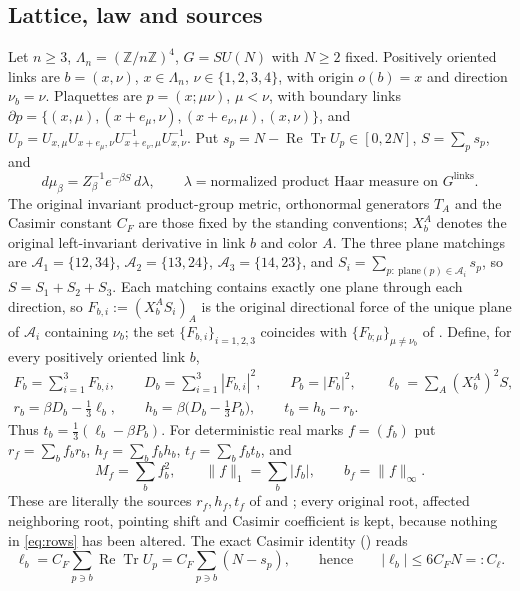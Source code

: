 \documentclass[11pt]{article}
\theoremstyle{definition}
\newcommand{\Tr}{\operatorname{Tr}}
\renewcommand{\Re}{\operatorname{Re}}
\begin{document}
\subsection{Lattice, law and sources}

Let $n\ge 3$, $\Lambda_n=(\mathbb Z/n\mathbb Z)^4$, $G=SU(N)$ with $N\ge 2$ fixed. Positively oriented links
are $b=(x,\nu)$, $x\in\Lambda_n$, $\nu\in\{1,2,3,4\}$, with origin $o(b)=x$ and direction $\nu_b=\nu$.
Plaquettes are $p=(x;\mu\nu)$, $\mu<\nu$, with boundary links $\partial p=\{(x,\mu),(x+e_\mu,\nu),(x+e_\nu,\mu),(x,\nu)\}$,
and $U_p=U_{x,\mu}U_{x+e_\mu,\nu}U_{x+e_\nu,\mu}^{-1}U_{x,\nu}^{-1}$. Put $s_p=N-\Re\Tr U_p\in[0,2N]$,
$S=\sum_p s_p$, and
\begin{equation}\label{eq:law}
d\mu_\beta=Z_\beta^{-1}e^{-\beta S}\,d\lambda,\qquad \lambda=\text{normalized product Haar measure on }G^{\text{links}}.
\end{equation}
The original invariant product-group metric, orthonormal generators $T_A$ and the Casimir constant $C_F$ are those
fixed by the standing conventions; $X_b^A$ denotes the original left-invariant derivative in link $b$ and color $A$.
The three plane matchings are
$\mathcal A_1=\{12,34\}$, $\mathcal A_2=\{13,24\}$, $\mathcal A_3=\{14,23\}$, and
$S_i=\sum_{p:\ \text{plane}(p)\in\mathcal A_i}s_p$, so $S=S_1+S_2+S_3$. Each matching contains exactly one plane
through each direction, so $F_{b,i}:=(X_b^AS_i)_A$ is the original directional force of the unique plane of
$\mathcal A_i$ containing $\nu_b$; the set $\{F_{b,i}\}_{i=1,2,3}$ coincides with $\{F_{b;\mu}\}_{\mu\neq\nu_b}$ of
\cite[definition of the sources]{cur}. Define, for every positively oriented link $b$,
\begin{equation}\label{eq:rows}
\begin{gathered}
F_b=\sum_{i=1}^3F_{b,i},\qquad D_b=\sum_{i=1}^3|F_{b,i}|^2,\qquad P_b=|F_b|^2,\qquad
\ell_b=\sum_A (X_b^A)^2S,\\
r_b=\beta D_b-\tfrac13\ell_b,\qquad h_b=\beta\big(D_b-\tfrac13 P_b\big),\qquad t_b=h_b-r_b .
\end{gathered}
\end{equation}
Thus $t_b=\tfrac13(\ell_b-\beta P_b)$. For deterministic real marks $f=(f_b)$ put
$r_f=\sum_bf_br_b$, $h_f=\sum_b f_bh_b$, $t_f=\sum_bf_bt_b$, and
\[
M_f=\sum_b f_b^2,\qquad \|f\|_1=\sum_b|f_b|,\qquad b_f=\|f\|_\infty .
\]
These are literally the sources $r_f,h_f,t_f$ of \cite[definition of the sources]{cur} and \cite[definition of the unchanged sources]{bhi}; every original
root, affected neighboring root, pointing shift and Casimir coefficient is kept, because nothing in
\eqref{eq:rows} has been altered. The exact Casimir identity (\cite[Casimir and physical-factor display]{bhi}) reads
\begin{equation}\label{eq:casimir}
\ell_b=C_F\sum_{p\ni b}\Re\Tr U_p=C_F\sum_{p\ni b}(N-s_p),\qquad\text{hence}\qquad |\ell_b|\le 6C_FN=:C_\ell .
\end{equation}
\end{document}
